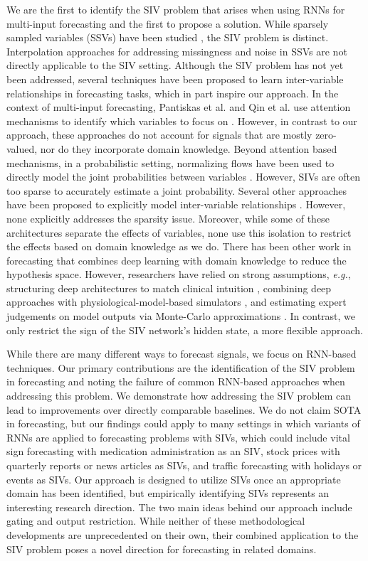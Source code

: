 \documentclass[letterpaper]{article}
\begin{document}
We are the first to identify the SIV problem that arises when using RNNs for multi-input forecasting and the first to propose a solution. While sparsely sampled variables (SSVs) have been studied \cite{missing}, the SIV problem is distinct. Interpolation approaches for addressing missingness and noise in SSVs are not directly applicable to the SIV setting. Although the SIV problem has not yet been addressed, several techniques have been proposed to learn inter-variable relationships in forecasting tasks, which in part inspire our approach. In the context of multi-input forecasting, Pantiskas et al. and Qin et al. use attention mechanisms to identify which variables to focus on \cite{attention1,cnnandatten}. However, in contrast to our approach, these approaches do not account for signals that are mostly zero-valued, nor do they incorporate domain knowledge. Beyond attention based mechanisms, in a probabilistic setting, normalizing flows have been used to directly model the joint probabilities between variables \cite{prob1,prob2}. However, SIVs are often too sparse to accurately estimate a joint probability. Several other approaches have been proposed to explicitly model inter-variable relationships \cite{cnn1,cnn2,cnnandatten,graphresid,sharedmulti}. However, none explicitly addresses the sparsity issue. Moreover, while some of these architectures separate the effects of variables, none use this isolation to restrict the effects based on domain knowledge as we do. There has been other work in forecasting that combines deep learning with domain knowledge to reduce the hypothesis space. However, researchers have relied on strong assumptions, \textit{e.g.}, structuring deep architectures to match clinical intuition \cite{gluexps}, combining deep approaches with physiological-model-based simulators \cite{wild}, and estimating expert judgements on model outputs via Monte-Carlo approximations \cite{domain}. In contrast, we only restrict the sign of the SIV network's hidden state, a more flexible approach.

While there are many different ways to forecast signals, we focus on RNN-based techniques. Our primary contributions are the identification of the SIV problem in forecasting and noting the failure of common RNN-based approaches when addressing this problem. We demonstrate how addressing the SIV problem can lead to improvements over directly comparable baselines. We do not claim SOTA in forecasting, but our findings could apply to many settings in which variants of RNNs are applied to forecasting problems with SIVs, which could include vital sign forecasting with medication administration as an SIV, stock prices with quarterly reports or news articles as SIVs, and  traffic forecasting with holidays or events as SIVs. Our approach is designed to utilize SIVs once an appropriate domain has been identified, but empirically identifying SIVs represents an interesting research direction. The two main ideas behind our approach include gating and output restriction. While neither of these methodological developments are unprecedented on their own, their combined application to the SIV problem poses a novel direction for forecasting in related domains.
\end{document}
